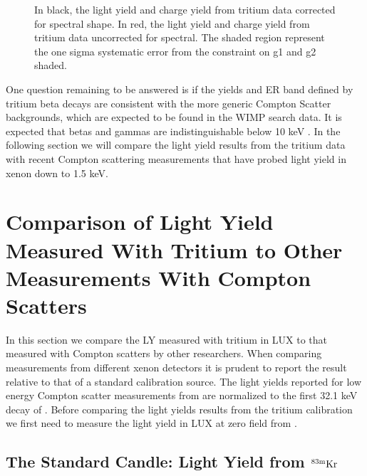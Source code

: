 \begin{figure}[p!]
\caption{In black, the light yield and charge yield from tritium data corrected for spectral shape. In red, the light yield and charge yield from tritium data uncorrected for spectral.  The shaded region represent the one sigma systematic error from the constraint on g1 and g2 shaded. }
\label{fig:LYQY_iter1_comp}
\end{figure}
\renewcommand{\baselinestretch}{2}
\small\normalsize



One question remaining to be answered is if the yields and ER band defined by tritium beta decays are consistent with the more generic Compton Scatter backgrounds, which are expected to be found in the WIMP search data. It is expected that betas and gammas are indistinguishable below 10 keV \cite{NEST} \cite{NEST_2013}. In the following section we will compare the light yield results from the tritium data with recent Compton scattering measurements that have probed light yield in xenon down to 1.5 keV. 




\newpage

\section{Comparison of Light Yield Measured With Tritium to Other Measurements With Compton Scatters}

In this section we compare the LY measured with tritium in LUX to that measured with Compton scatters by other researchers.
When comparing measurements from different xenon detectors it is prudent to report the result relative to that of a standard calibration source. The light yields reported for low energy Compton scatter measurements from  \cite{Baudis} \cite{Aprile_LY} are normalized to the first 32.1 keV decay of \KrCal. Before comparing the light yields results from the tritium calibration we first need to measure the light yield in LUX at zero field from \KrCal.

\subsection{The Standard Candle: Light Yield from $\rm^{83m}Kr$}


